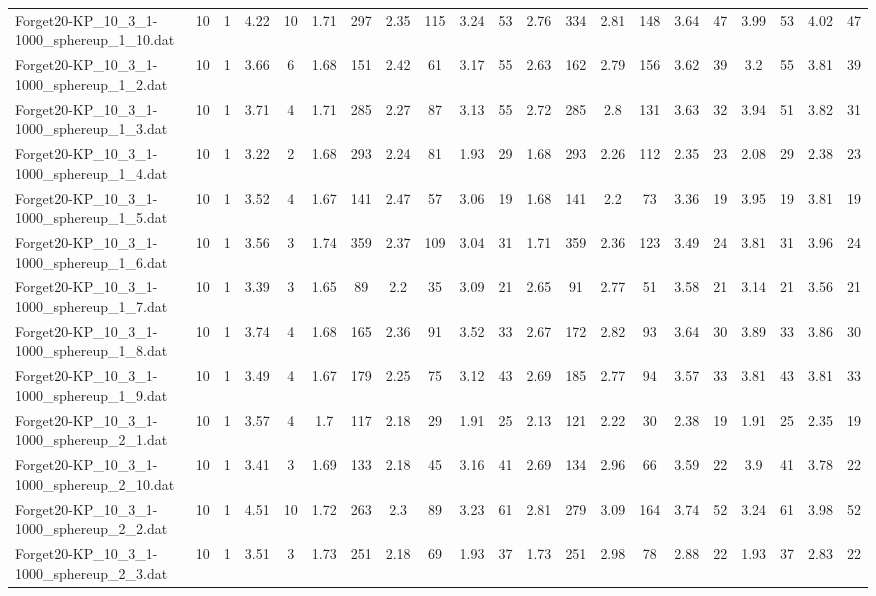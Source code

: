 \begin{sidewaystable}[!ht]
{\begin{tabular}{lcccccccccccccccccccc}
Forget20-KP\_10\_3\_1-1000\_sphereup\_1\_10.dat & 10 & 1 & 4.22 & 10 & 1.71 & 297 & 2.35 & 115 & 3.24 & 53 & 2.76 & 334 & 2.81 & 148 & 3.64 & 47 & 3.99 & 53 & 4.02 & 47 \\
Forget20-KP\_10\_3\_1-1000\_sphereup\_1\_2.dat & 10 & 1 & 3.66 & 6 & 1.68 & 151 & 2.42 & 61 & 3.17 & 55 & 2.63 & 162 & 2.79 & 156 & 3.62 & 39 & 3.2 & 55 & 3.81 & 39 \\
Forget20-KP\_10\_3\_1-1000\_sphereup\_1\_3.dat & 10 & 1 & 3.71 & 4 & 1.71 & 285 & 2.27 & 87 & 3.13 & 55 & 2.72 & 285 & 2.8 & 131 & 3.63 & 32 & 3.94 & 51 & 3.82 & 31 \\
Forget20-KP\_10\_3\_1-1000\_sphereup\_1\_4.dat & 10 & 1 & 3.22 & 2 & 1.68 & 293 & 2.24 & 81 & 1.93 & 29 & 1.68 & 293 & 2.26 & 112 & 2.35 & 23 & 2.08 & 29 & 2.38 & 23 \\
Forget20-KP\_10\_3\_1-1000\_sphereup\_1\_5.dat & 10 & 1 & 3.52 & 4 & 1.67 & 141 & 2.47 & 57 & 3.06 & 19 & 1.68 & 141 & 2.2 & 73 & 3.36 & 19 & 3.95 & 19 & 3.81 & 19 \\
Forget20-KP\_10\_3\_1-1000\_sphereup\_1\_6.dat & 10 & 1 & 3.56 & 3 & 1.74 & 359 & 2.37 & 109 & 3.04 & 31 & 1.71 & 359 & 2.36 & 123 & 3.49 & 24 & 3.81 & 31 & 3.96 & 24 \\
Forget20-KP\_10\_3\_1-1000\_sphereup\_1\_7.dat & 10 & 1 & 3.39 & 3 & 1.65 & 89 & 2.2 & 35 & 3.09 & 21 & 2.65 & 91 & 2.77 & 51 & 3.58 & 21 & 3.14 & 21 & 3.56 & 21 \\
Forget20-KP\_10\_3\_1-1000\_sphereup\_1\_8.dat & 10 & 1 & 3.74 & 4 & 1.68 & 165 & 2.36 & 91 & 3.52 & 33 & 2.67 & 172 & 2.82 & 93 & 3.64 & 30 & 3.89 & 33 & 3.86 & 30 \\
Forget20-KP\_10\_3\_1-1000\_sphereup\_1\_9.dat & 10 & 1 & 3.49 & 4 & 1.67 & 179 & 2.25 & 75 & 3.12 & 43 & 2.69 & 185 & 2.77 & 94 & 3.57 & 33 & 3.81 & 43 & 3.81 & 33 \\
Forget20-KP\_10\_3\_1-1000\_sphereup\_2\_1.dat & 10 & 1 & 3.57 & 4 & 1.7 & 117 & 2.18 & 29 & 1.91 & 25 & 2.13 & 121 & 2.22 & 30 & 2.38 & 19 & 1.91 & 25 & 2.35 & 19 \\
Forget20-KP\_10\_3\_1-1000\_sphereup\_2\_10.dat & 10 & 1 & 3.41 & 3 & 1.69 & 133 & 2.18 & 45 & 3.16 & 41 & 2.69 & 134 & 2.96 & 66 & 3.59 & 22 & 3.9 & 41 & 3.78 & 22 \\
Forget20-KP\_10\_3\_1-1000\_sphereup\_2\_2.dat & 10 & 1 & 4.51 & 10 & 1.72 & 263 & 2.3 & 89 & 3.23 & 61 & 2.81 & 279 & 3.09 & 164 & 3.74 & 52 & 3.24 & 61 & 3.98 & 52 \\
Forget20-KP\_10\_3\_1-1000\_sphereup\_2\_3.dat & 10 & 1 & 3.51 & 3 & 1.73 & 251 & 2.18 & 69 & 1.93 & 37 & 1.73 & 251 & 2.98 & 78 & 2.88 & 22 & 1.93 & 37 & 2.83 & 22 \\

\end{tabular}}
\end{sidewaystable}
